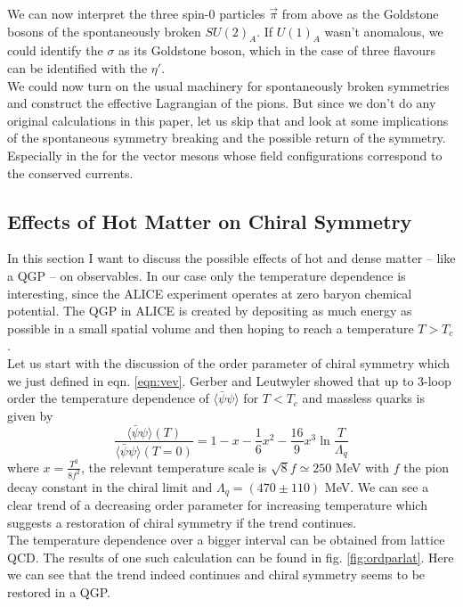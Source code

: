 We can now interpret the three spin-0 particles $\vec{\pi}$ from above as the Goldstone bosons of the spontaneously broken $SU(2)_A$. If $U(1)_A$ wasn't anomalous, we could identify the $\sigma$ as its Goldstone boson, which in the case of three flavours can be identified with the $\eta'$. \\
We could now turn on the usual machinery for spontaneously broken symmetries and construct the effective Lagrangian of the pions. But since we don't do any original calculations in this paper, let us skip that and look at some implications of the spontaneous symmetry breaking and the possible return of the symmetry. Especially in the for the vector mesons whose field configurations correspond to the conserved currents.

\subsection{Effects of Hot Matter on Chiral Symmetry}
In this section I want to discuss the possible effects of hot and dense matter -- like a QGP -- on observables. In our case only the temperature dependence is interesting, since the ALICE experiment operates at zero baryon chemical potential. The QGP in ALICE is created by depositing as much energy as possible in a small spatial volume and then hoping to reach a temperature $T > T_c$. \\
Let us start with the discussion of the order parameter of chiral symmetry which we just defined in eqn. \ref{eqn:vev}. Gerber and Leutwyler showed that up to 3-loop order the temperature dependence of $\langle \bar{\psi} \psi \rangle$ for $T < T_c$ and massless quarks is given by \cite{OrdPar3loop}
\begin{equation}
\label{eqn:vevT}
\frac{\langle \bar{\psi} \psi \rangle(T)}{\langle \bar{\psi} \psi \rangle(T=0)} = 1 - x - \frac{1}{6} x^2 - \frac{16}{9} x^3 \ln \frac{T}{\Lambda_q}
\end{equation}
where $x = \frac{T^2}{8f^2}$, the relevant temperature scale is $\sqrt{8}f \simeq 250$ MeV with $f$ the pion decay constant in the chiral limit and $\Lambda_q = (470 \pm 110)$ MeV. We can see a clear trend of a decreasing order parameter for increasing temperature which suggests a restoration of chiral symmetry if the trend continues. \\
The temperature dependence over a bigger interval can be obtained from lattice QCD. The results of one such calculation can be found in fig. \ref{fig:ordparlat}. Here we can see that the trend indeed continues and chiral symmetry seems to be restored in a QGP.
